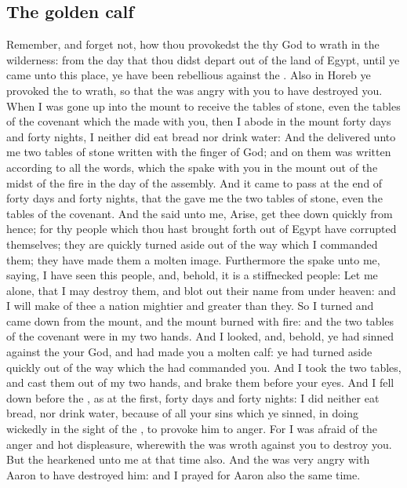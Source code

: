 \begin{biblechapter}
\section*{The golden calf}
\verse Remember, and forget not, how thou provokedst the \LORD thy God to wrath in the wilderness: from the day that thou didst depart out of the land of Egypt, until ye came unto this place, ye have been rebellious against the \LORD.
\verse Also in Horeb ye provoked the \LORD to wrath, so that the \LORD was angry with you to have destroyed you.
\verse When I was gone up into the mount to receive the tables of stone, even the tables of the covenant which the \LORD made with you, then I abode in the mount forty days and forty nights, I neither did eat bread nor drink water:
\verse And the \LORD delivered unto me two tables of stone written with the finger of God; and on them was written according to all the words, which the \LORD spake with you in the mount out of the midst of the fire in the day of the assembly.
\verse And it came to pass at the end of forty days and forty nights, that the \LORD gave me the two tables of stone, even the tables of the covenant.
\verse And the \LORD said unto me, Arise, get thee down quickly from hence; for thy people which thou hast brought forth out of Egypt have corrupted themselves; they are quickly turned aside out of the way which I commanded them; they have made them a molten image.
\verse Furthermore the \LORD spake unto me, saying, I have seen this people, and, behold, it is a stiffnecked people:
\verse Let me alone, that I may destroy them, and blot out their name from under heaven: and I will make of thee a nation mightier and greater than they.
\verse So I turned and came down from the mount, and the mount burned with fire: and the two tables of the covenant were in my two hands.
\verse And I looked, and, behold, ye had sinned against the \LORD your God, and had made you a molten calf: ye had turned aside quickly out of the way which the \LORD had commanded you.
\verse And I took the two tables, and cast them out of my two hands, and brake them before your eyes.
\verse And I fell down before the \LORD, as at the first, forty days and forty nights: I did neither eat bread, nor drink water, because of all your sins which ye sinned, in doing wickedly in the sight of the \LORD, to provoke him to anger.
\verse For I was afraid of the anger and hot displeasure, wherewith the \LORD was wroth against you to destroy you. But the \LORD hearkened unto me at that time also.
\verse And the \LORD was very angry with Aaron to have destroyed him: and I prayed for Aaron also the same time.

\end{biblechapter}
